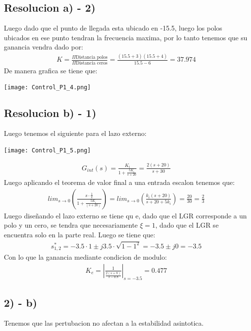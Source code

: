 \documentclass[
  11pt,
  letterpaper,
   addpoints,
  ]{exam}
\begin{document}
\begin{questions}
\begin{solution}
\subsection*{Resolucion a) - 2)}
Luego dado que el punto de llegada esta ubicado en -15.5, luego los polos ubicados en ese punto tendran la frecuencia maxima, por lo tanto tenemos que su ganancia vendra dado por:
\begin{align}
    K= \frac{\Pi \text{Distancia polos}}{\Pi \text{Distancia ceros}} = \frac{(15.5+3)(15.5+4)}{15.5-6} = 37.974
\end{align}
De manera grafica se tiene que:
\begin{center}
    \texttt{[image: Control\_P1\_4.png]}
\end{center}
\subsection*{Resolucion b) - 1)}
Luego tenemos el siguiente para el lazo externo:
\begin{center}
    \texttt{[image: Control\_P1\_5.png]}
\end{center}
\begin{align}
    G_{int}(s) = \frac{K_{i}}{1+\frac{5K_i}{s+20}}= \frac{2(s+20)}{s+30}
\end{align}
Luego aplicando el teorema de valor final a una entrada escalon tenemos que:
\begin{align}
    lim_{s \rightarrow 0}\left(\frac{s \cdot \frac{1}{s}}{1+ \frac{5K_i}{(s+20)}}\right) = lim_{s \rightarrow 0} \left(\frac{k_{i}(s+20)}{s+20+5k_i}\right) = \frac{20}{30} = \frac{2}{3}
\end{align}
Luego diseñando el lazo externo se tiene qu e, dado que el LGR corresponde a un polo y un cero, se tendra que necesariamente $\xi=1$, dado que el LGR se encuentra solo en la parte real. Luego se tiene que:
\begin{align}
    s_{1,2}^{*} = -3.5 \cdot 1 \pm j3.5 \cdot \sqrt{1-1^{2}} = -3.5 \pm j0 = -3.5
\end{align}
Con lo que la ganancia mediante condicion de modulo:
\begin{align}
    K_{e} = \left| \frac{1}{\frac{2(s+8)}{s-0.8}}\right|_{s=-3.5} = 0.477
\end{align}
\subsection*{2) - b)}
Tenemos que las pertubacion no afectan a la estabilidad asintotica.

\end{solution}
\end{questions}
\end{document}
